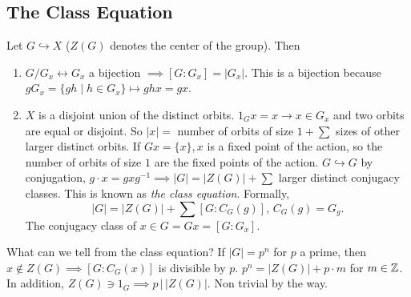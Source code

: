 \subsection{The Class Equation}
Let $G \hookrightarrow X$ ($Z(G)$ denotes the center of the group). Then 
\begin{enumerate}
    \item $G /G_x \longleftrightarrow G_x$ a bijection $\implies [G:G_x]=|G_x|$. This is a bijection because $gG_x=\{gh \mid h\in G_x\} \mapsto ghx=gx$.
    \item $X$ is a disjoint union of the distinct orbits. $1_Gx=x \to x\in G_x$ and two orbits are equal or disjoint. So  $|x|=$ number of orbits of size $1+\sum$ sizes of other larger distinct orbits. If $Gx=\{x\} , x$ is a fixed point of the action, so the number of orbits of size $1$ are the fixed points of the action. $G \hookrightarrow G$ by conjugation, $g\cdot x=gxg^{-1} \implies |G|=|Z(G)|+\sum$ larger distinct conjugacy classes. This is known as \emph{the class equation}. Formally, \[
            |G|=|Z(G)|+\sum\left[  G:C_G(g)\right] , \, C_G(g)=G_g.
        \] The conjugacy class of $x\in G=Gx=[G:G_x]$.
\end{enumerate}
What can we tell from the class equation? If $|G|=p^n$ for $p$ a prime, then $x \notin Z(G) \implies \left[ G:C_G(x) \right] $ is divisible by $p$. $p^n=|Z(G)|+p\cdot m$ for $m\in \mathbb{Z}$. In addition, $Z(G) \ni 1_G \implies p \, \big| \, |Z(G)|$. Non trivial by the way.


